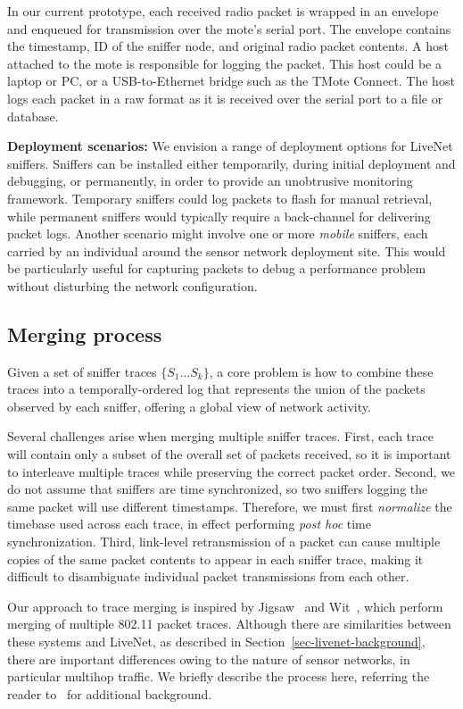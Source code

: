 In our current prototype, each received radio packet is wrapped in an
envelope and enqueued for transmission over the mote's serial port.
The envelope contains the timestamp, ID of the sniffer node, and
original radio packet contents.
A host attached to the mote is responsible for logging the packet.
This host could be a laptop or PC, or a USB-to-Ethernet bridge such as
the TMote Connect. The host logs each packet in a raw format as it is
received over the serial port to a file or database.

{\bf Deployment scenarios:}
We envision a range of deployment options for LiveNet
sniffers. Sniffers can be installed either temporarily, 
during initial deployment and debugging, or permanently, 
in order to provide an unobtrusive monitoring framework. Temporary
sniffers could log packets to flash for manual retrieval, while
permanent sniffers would typically require a back-channel for
delivering packet logs. Another scenario might involve one or more
{\em mobile} sniffers, each carried by an individual around the sensor
network deployment site. This would be particularly useful for
capturing packets to debug a performance problem without disturbing 
the network configuration.  

\subsection{Merging process}
\label{sec-livenet-merging}

Given a set of sniffer traces $\{ S_1 \ldots S_k \}$, a core problem 
is how to
combine these traces into a temporally-ordered log that represents the
union of the packets observed by each sniffer, offering a global view
of network activity. 

Several challenges arise when merging multiple sniffer traces.
First, each trace will contain only a subset of the overall set of
packets received, so it is important to interleave multiple traces
while preserving the correct packet order. Second, we do not assume
that sniffers are time synchronized, so two sniffers logging the same
packet will use different timestamps. Therefore, we must first {\em
normalize} the timebase used across each trace, in effect performing
{\em post hoc} time synchronization. Third, link-level retransmission
of a packet can cause multiple copies of the same packet contents to
appear in each sniffer trace, making it difficult to
disambiguate individual packet transmissions from each other.

Our approach to trace merging is inspired by Jigsaw~\cite{jigsaw} 
and Wit~\cite{wit}, which perform merging of multiple 802.11 packet 
traces. Although there are similarities between these systems and 
LiveNet, as described in Section~\ref{sec-livenet-background}, there are 
important differences owing to the nature of sensor networks, in 
particular multihop traffic. We briefly describe the process here,
referring the reader to~\cite{jigsaw,wit} for additional background.

